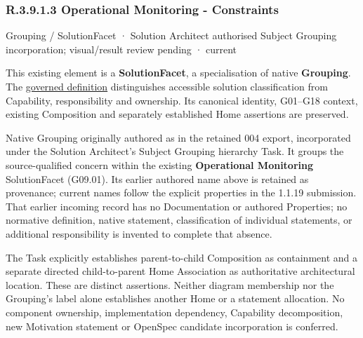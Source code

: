 \subsubsection*{R.3.9.1.3 Operational Monitoring - Constraints}
\label{navigation:R.3.9.1.3}

\label{element:b558d26d626b4276bd5ec38b8d42213a}
{\small Grouping / SolutionFacet · Solution Architect authorised Subject Grouping incorporation; visual/result review pending · current}\par

This existing element is a \textbf{SolutionFacet}, a specialisation of native
\textbf{Grouping}. The \href{\detokenize{../../../../../../../governance/continuum-representation.md#solutionfacet-classification--1119-candidate}}{governed definition}
distinguishes accessible solution classification from Capability, responsibility
and ownership. Its canonical identity, G01–G18 context, existing Composition
and separately established Home assertions are preserved.



Native Grouping originally authored as \texttt{} in the retained 004 export,
incorporated under the Solution Architect's Subject Grouping hierarchy Task.
It groups the source-qualified \texttt{} concern within
the existing \textbf{Operational Monitoring} SolutionFacet (G09.01). Its earlier authored name above is retained as provenance; current names
follow the explicit properties in the 1.1.19 submission.
That earlier incoming record has no Documentation or authored Properties; no normative
definition, native statement, classification of individual statements, or
additional responsibility is invented to complete that absence.



The Task explicitly establishes parent-to-child Composition as containment and
a separate directed child-to-parent Home Association as authoritative architectural
location. These are distinct assertions. Neither diagram membership nor the
Grouping's label alone establishes another Home or a statement allocation.
No component ownership, implementation dependency, Capability decomposition,
new Motivation statement or OpenSpec candidate incorporation is conferred.



